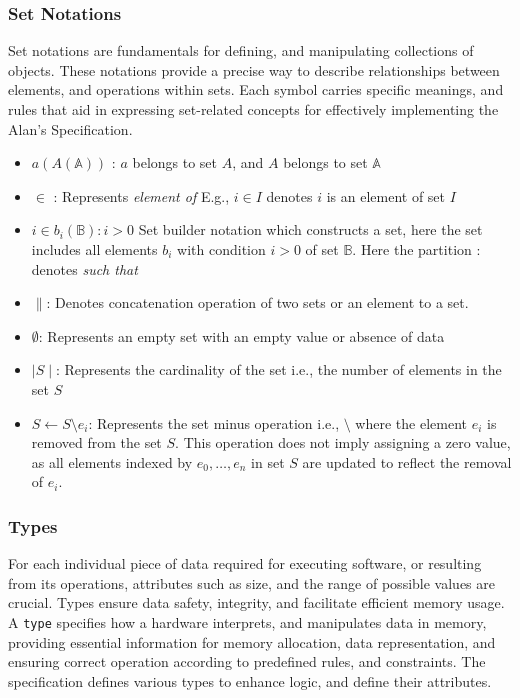 \documentclass[../alan-handbook.tex]{subfiles}
\begin{document}
\subsubsection{Set Notations} \label{SetNotations}

Set notations are fundamentals for defining, and manipulating collections of objects. These notations provide a precise way to describe relationships between elements, and operations within sets. Each symbol carries specific meanings, and rules that aid in expressing set-related concepts for effectively implementing the Alan's Specification.

\begin{itemize}
    \item $a(A(\mathbb{A}))$ : $a$ belongs to set $A$, and $A$ belongs to set $\mathbb{A}$
    \item $\in$ : Represents \textit{element of} E.g., $i \in I$ denotes $i$ is an element of set $I$
    \item $i \in b_i(\mathbb{B}): i>0$ Set builder notation which constructs a set, here the set includes all elements $b_i$ with condition $i > 0$ of set $\mathbb{B}$. Here the partition $:$ denotes \textit{such that}
    \item $\parallel $: Denotes concatenation operation of two sets or an element to a set.
    \item $\emptyset$: Represents an empty set with an empty value or absence of data
    \item $\mid S \mid$: Represents the cardinality of the set i.e., the number of elements in the set $S$
    \item $S \gets S \setminus e_i$: Represents the set minus operation i.e., $\setminus$ where the element $e_i$ is removed from the set $S$. This operation does not imply assigning a zero value, as all elements indexed by $e_0, \ldots, e_n$ in set $S$ are updated to reflect the removal of $e_i$.
\end{itemize}

\subsubsection{Types} \label{Types}

For each individual piece of data required for executing software, or resulting from its operations, attributes such as size, and the range of possible values are crucial. Types ensure data safety, integrity, and facilitate efficient memory usage. A \texttt{type} specifies how a hardware interprets, and manipulates data in memory, providing essential information for memory allocation, data representation, and ensuring correct operation according to predefined rules, and constraints. The specification defines various types to enhance logic, and define their attributes.
\end{document}
